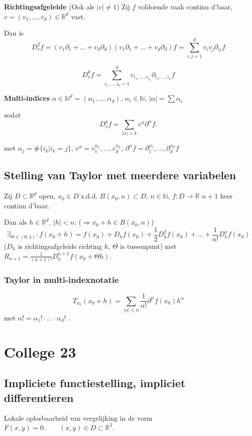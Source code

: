 \documentclass[a4paper]{exam}
\theoremstyle{definition}
\newcommand{\naturals}{\mathbb{N}}
\newcommand{\reals}{\mathbb{R}}
\begin{document}
			 \textbf{Richtingsafgeleide} (Ook als $|v|\neq 1$)
			Zij $f$ voldoende vaak continu d'baar, $v=(v_1,...,v_d) \in \reals^d$ vast.
			
			Dan is \[ D_v^2 f = (v_1 \partial_1 + ... + v_d \partial_d)(v_1 \partial_1 + ... + v_d \partial_d)f = \sum_{i,j=1}^{d} v_i v_j \partial_{ij}f \]
			
			\[ D_v^k f = \sum_{i_1,...,i_k=1}^{d} v_{{i_1},...,v_{i_k}} \partial_{i_1,...,i_k} f \]
			
			\nota \textbf{Multi-indices} $ \alpha \in \naturals^d = (\alpha_1 ,..., \alpha_d) $, $\alpha_i \in \naturals$, $ |\alpha| = \sum \alpha_i $
			
			zodat \[ D_v^k f = \sum_{|\alpha|=k} v^\alpha \partial^\alpha f. \]
			
			met $ \alpha_j = \#\{i_k | i_k = j\} $, $ v^\alpha = v_1^{\alpha_1} ,..., v_d^{\alpha_k} $, $ \partial^\alpha f = \partial_1^{\alpha_1},...,\partial_d^{\alpha_d} f $
			
		\subsection{Stelling van Taylor met meerdere variabelen}
			\theorem Zij  $D \subset \reals^d$ open, $x_0 \in D$ z.d.d. $B(x_0,n) \subset D$, $n\in \naturals$, $f:D\to \reals$ $n+1$ keer continu d'baar.
			
			Dan als $h \in \reals^d$, $ |h|<n $: ($\Rightarrow x_0+h \in B(x_0,n)$)
			\[ \exists_{\Theta \in (0,1)}:f(x_0+h) = f(x_0) + D_h f(x_0) + \frac{1}{2} D_h^2 f(x_0) + \dots + \frac{1}{n!} D_h^n f(x_0) \]
			($D_h$ is richtingsafgeleide richting $h$, $\Theta$ is tussenpunt)
			met $R_{n+1} = \frac{1}{(n+1)!}D_h^{n+1} f(x_0 + \Theta h)$.
		
			\subsubsection{Taylor in multi-indexnotatie}
				\[ T_{x_0} (x_0 + h) = \sum_{|\alpha|\le n} \frac{1}{\alpha !} \partial^\alpha f(x_0)h^\alpha \] met $ \alpha ! = \alpha_1 ! \cdot ... \cdot \alpha_d !$ .
		
	\newpage
	\section{College 23}
		\subsection{Impliciete functiestelling, impliciet differentieren}
			Lokale oplosbaarheid van vergelijking in de vorm $ F(x,y)=0. \qquad (x,y) \in D \subset \reals^2. $
			
\end{document}
